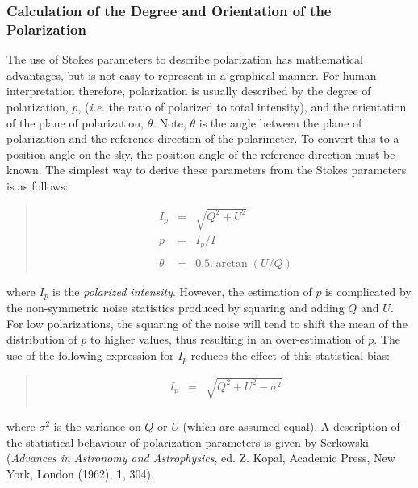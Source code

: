 \documentclass[twoside,11pt]{article}
\renewcommand{\_}{\texttt{\symbol{95}}}
\newenvironment{myquote}{\begin{quote}\begin{small}}{\end{small}\end{quote}}
\begin{document}
\subsubsection{Calculation of the Degree and Orientation of the Polarization}
The use of Stokes parameters to describe polarization has mathematical
advantages, but is not easy to represent in a graphical manner. For human
interpretation therefore, polarization is usually described by the degree
of polarization, $p$, (\emph{i.e.} the ratio of polarized to total intensity),
and the orientation of the plane of polarization, $\theta$. Note,
$\theta$ is the angle between the plane of polarization and the reference
direction of the polarimeter. To convert this to a position angle on the
sky, the position angle of the reference direction must be known. The
simplest way to derive these parameters from the Stokes parameters is as
follows:

\begin{myquote}
\begin{eqnarray*}
  I_{p} & = & \sqrt{ Q^{2} + U^{2} } \\
  p & = & I_{p}/I \\ \\
  \theta & = & 0.5.\arctan (U/Q)
\end{eqnarray*}
\end{myquote}

where $I_{p}$ is the \emph{polarized intensity}. However, the estimation
of $p$ is complicated by the non-symmetric noise statistics produced by
squaring and adding $Q$ and $U$. For low polarizations, the squaring of
the noise will tend to shift the mean of the distribution of $p$ to
higher values, thus resulting in an over-estimation of $p$. The use of
the following expression for $I_{p}$ reduces the effect of this
statistical bias:

\begin{myquote}
\begin{eqnarray*}
  I_{p} & = & \sqrt{ Q^{2} + U^{2} - \sigma^{2}} \\
\end{eqnarray*}
\end{myquote}

where $\sigma^{2}$ is the variance on $Q$ or $U$ (which are assumed
equal). A description of the statistical behaviour of polarization
parameters is given by Serkowski (\emph{Advances in Astronomy and
Astrophysics}, ed. Z. Kopal, Academic Press, New York, London (1962),
\textbf{1}, 304).
\end{document}
